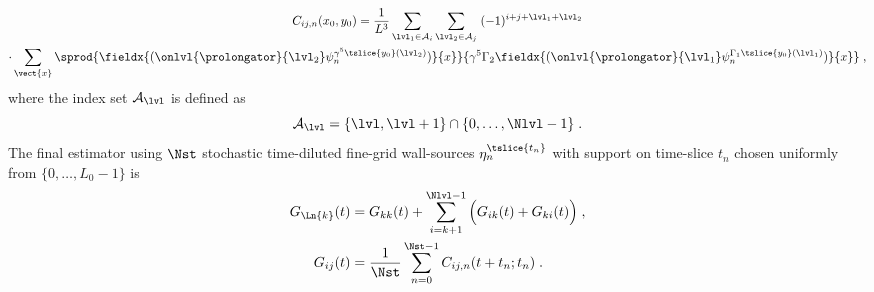 \begin{multline}
C_{ij,n}(x_0, y_0)
= \frac{1}{L^{3}}
\sum_{\lvl_1 \in \mathcal{A}_i} \sum_{\lvl_2 \in \mathcal{A}_j} \;
(-1)^{i+j + \lvl_1 + \lvl_2} \\
\cdot \sum_{\vect{x}} \sprod{
	\fieldx{( \onlvl{\mathcal{\prolongator}}{\lvl_2}\psi_{n}^{\gamma^{5} \tslice{y_0} (\lvl_2)})}{x}
}{
	\gamma^{5}
	\Gamma_2
	\fieldx{( \onlvl{\mathcal{\prolongator}}{\lvl_1}\psi_{n}^{\Gamma_1 \tslice{y_0} (\lvl_1)})}{x}
} \;,
\end{multline}
where the index set $\mathcal{A}_\lvl$ is defined as
\begin{equation}
\mathcal{A}_\lvl = \{\lvl,\lvl+1\} \cap \{0, \ldots, \Nlvl-1\} \;.
\end{equation}
The final estimator using $\Nst$ stochastic time-diluted fine-grid wall-sources $\eta_n^{\tslice{t_n}}$ with support on time-slice $t_n$ chosen uniformly from $\{0, \ldots, L_0 - 1\}$ is
\begin{align} \label{eq:stoch:Gij:final}
G_{\Ln{k}}(t) &= G_{kk}(t) + \sum_{i=k+1}^{\Nlvl-1} \Big( G_{ik}(t) + G_{ki}(t) \Big) \;, \\
G_{ij}(t) &= \frac{1}{\Nst} \sum_{n=0}^{\Nst-1} C_{ij,n}(t+t_n;t_n) \;.
\end{align}

